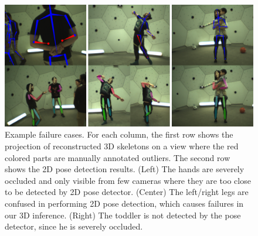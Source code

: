 

\begin{figure}[t]
	\centering
	\includegraphics[width=\linewidth]{figures/FailureCases3}
	\caption{Example failure cases. For each column, the first row shows the projection of reconstructed 3D skeletons on a view where the red colored parts are manually annotated outliers. The second row shows the 2D pose detection results. (Left) The hands are severely occluded and only visible from few cameras where they are too close to be detected by 2D pose detector. (Center) The left/right legs are confused in performing 2D pose detection, which causes failures in our 3D inference. (Right) The toddler is not detected by the pose detector, since he is severely occluded. }\label{fig:failures}
\end{figure}


